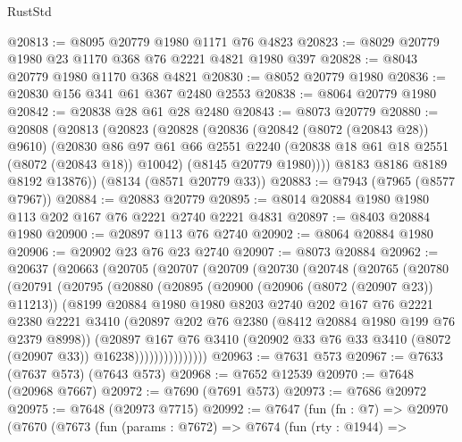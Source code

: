 \begin{lexlean}{RustStd}
\begin{coremodule}
@20813 := @8095 @20779 @1980 @1171 @76 @4823
@20823 := @8029 @20779 @1980 @23 @1170 @368 @76 @2221 @4821 @1980 @397
@20828 := @8043 @20779 @1980 @1170 @368 @4821
@20830 := @8052 @20779 @1980
@20836 := @20830 @156 @341 @61 @367 @2480 @2553
@20838 := @8064 @20779 @1980
@20842 := @20838 @28 @61 @28 @2480
@20843 := @8073 @20779
@20880 := @20808
    (@20813
      (@20823
        (@20828
          (@20836
            (@20842 (@8072 (@20843 @28)) @9610)
            (@20830
              @86
              @97
              @61
              @66
              @2551
              @2240
              (@20838 @18 @61 @18 @2551 (@8072 (@20843 @18)) @10042)
              (@8145 @20779 @1980))))
        @8183
        @8186
        @8189
        @8192
        @13876))
    (@8134 (@8571 @20779 @33))
@20883 := @7943 (@7965 (@8577 @7967))
@20884 := @20883 @20779
@20895 := @8014 @20884 @1980 @1980 @113 @202 @167 @76 @2221 @2740 @2221 @4831
@20897 := @8403 @20884 @1980
@20900 := @20897 @113 @76 @2740
@20902 := @8064 @20884 @1980
@20906 := @20902 @23 @76 @23 @2740
@20907 := @8073 @20884
@20962 := @20637
    (@20663
      (@20705
        (@20707
          (@20709
            (@20730
              (@20748
                (@20765
                  (@20780
                    (@20791
                      (@20795
                        (@20880
                          (@20895
                            (@20900 (@20906 (@8072 (@20907 @23)) @11213))
                            (@8199
                              @20884
                              @1980
                              @1980
                              @8203
                              @2740
                              @202
                              @167
                              @76
                              @2221
                              @2380
                              @2221
                              @3410
                              (@20897 @202 @76 @2380 (@8412 @20884 @1980 @199 @76 @2379 @8998))
                              (@20897
                                @167
                                @76
                                @3410
                                (@20902 @33 @76 @33 @3410 (@8072 (@20907 @33)) @16238)))))))))))))))
@20963 := @7631 @573
@20967 := @7633 (@7637 @573) (@7643 @573)
@20968 := @7652 @12539
@20970 := @7648 (@20968 @7667)
@20972 := @7690 (@7691 @573)
@20973 := @7686 @20972
@20975 := @7648 (@20973 @7715)
@20992 := @7647
    (fun (fn : @7) =>
    @20970
      (@7670
        (@7673
          (fun (params : @7672) =>
          @7674
            (fun (rty : @1944) =>

\end{coremodule}
\end{lexlean}
